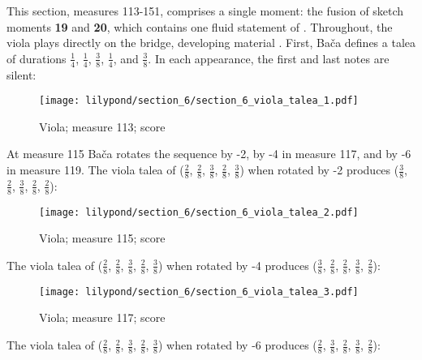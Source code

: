 
This section, measures 113-151, comprises a single moment: the fusion of sketch moments \textbf{19} and \textbf{20}, which contains one fluid statement of . Throughout, the viola plays directly on the bridge, developing material . First, Bača defines a talea of durations $\frac{1}{4}$, $\frac{1}{4}$, $\frac{3}{8}$, $\frac{1}{4}$, and $\frac{3}{8}$. In each appearance, the first and last notes are silent:

\setcounter{figure}{30}
\begin{figure}[H]
    \texttt{[image: lilypond/section\_6/section\_6\_viola\_talea\_1.pdf]}
    \caption{Viola; measure 113; score}
    \label{fig:section-6-talea-1}
\end{figure}

At measure 115 Bača rotates the sequence by -2, by -4 in measure 117, and by -6 in measure 119. The viola talea of ($\frac{2}{8}$, $\frac{2}{8}$, $\frac{3}{8}$, $\frac{2}{8}$, $\frac{3}{8}$) when rotated by -2 produces ($\frac{3}{8}$, $\frac{2}{8}$, $\frac{3}{8}$, $\frac{2}{8}$, $\frac{2}{8}$):

\setcounter{figure}{31}
\begin{figure}[H]
    \texttt{[image: lilypond/section\_6/section\_6\_viola\_talea\_2.pdf]}
    \caption{Viola; measure 115; score}
    \label{fig:section-6-talea-2}
\end{figure}

The viola talea of ($\frac{2}{8}$, $\frac{2}{8}$, $\frac{3}{8}$, $\frac{2}{8}$, $\frac{3}{8}$) when rotated by -4 produces ($\frac{3}{8}$, $\frac{2}{8}$, $\frac{2}{8}$, $\frac{3}{8}$, $\frac{2}{8}$):

\setcounter{figure}{32}
\begin{figure}[H]
    \texttt{[image: lilypond/section\_6/section\_6\_viola\_talea\_3.pdf]}
    \caption{Viola; measure 117; score}
    \label{fig:section-6-talea-3}
\end{figure}

The viola talea of ($\frac{2}{8}$, $\frac{2}{8}$, $\frac{3}{8}$, $\frac{2}{8}$, $\frac{3}{8}$) when rotated by -6 produces ($\frac{2}{8}$, $\frac{3}{8}$, $\frac{2}{8}$, $\frac{3}{8}$, $\frac{2}{8}$):

